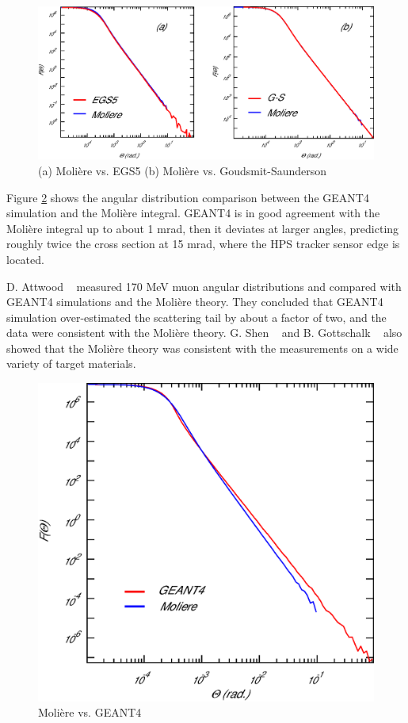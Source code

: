 \begin{figure}[h]
\includegraphics[height=3 in]{appendix/appendix_1.eps}
\caption{\small{ (a) Moli\`{e}re vs. EGS5 \hspace{1 cm} (b) Moli\`{e}re vs. Goudsmit-Saunderson}}
\label{appendix:1}
\end{figure}

Figure \ref{appendix:2} shows the angular distribution comparison between the GEANT4 
simulation and the Moli\`{e}re integral. 
GEANT4 is in good agreement with the Moli\`{e}re integral up to about 1 mrad, then it 
deviates at larger angles, predicting roughly twice the cross section at 15 mrad, 
where the HPS tracker sensor edge is located.

D. Attwood \etal~ measured 170 MeV muon angular distributions and compared with 
GEANT4 simulations and the Moli\`{e}re theory. \cite{attwood} They concluded that GEANT4 
simulation over-estimated the scattering tail by about a factor of two, and the data were consistent
with the Moli\`{e}re theory. G. Shen \etal~ \cite{shen} and B. Gottschalk \etal~ \cite{gottschalk}
also showed that the Moli\`{e}re theory was consistent with the measurements on a wide variety of
target materials.

\begin{figure}[h]
\includegraphics[height= 3 in]{appendix/appendix_2.eps}
\caption{\small{ Moli\`{e}re vs. GEANT4 }}
\label{appendix:2}
\end{figure}

